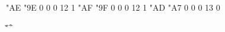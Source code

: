 

\setcharcode  "AE  "9E    0    0     0  12  1  \texmacro \flqq
\setcharcode  "AF  "9F    0    0     0  12  1  \texmacro \frqq
\setcharcode  "AD  "A7    0    0     0  13  0  \expandto {\S}

\redefaccent \'
\redefaccent \v
\redefaccent \"
\redefaccent \^
\redefaccent \r

